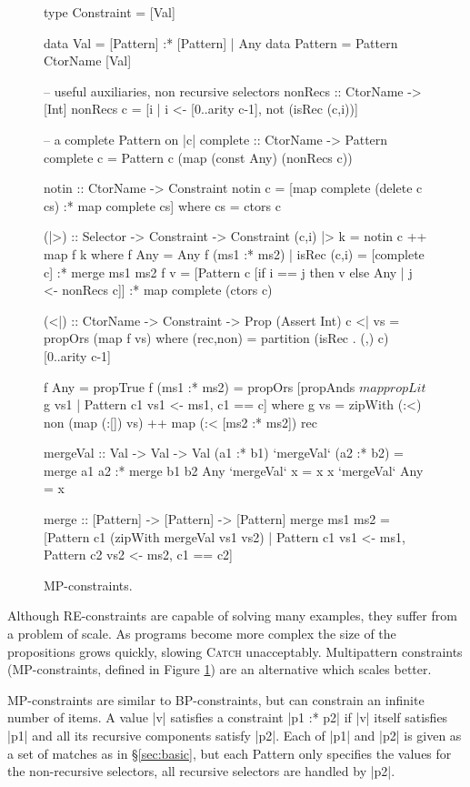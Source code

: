 \documentclass[preprint]{sigplanconf}
\newcommand{\C}[1]{\textsf{#1}}
\newcommand{\catch}{\textsc{Catch}}
\begin{document}
\begin{figure}
\begin{code}
type Constraint = [Val]

data Val      =  [Pattern] :* [Pattern]
              |  Any
data Pattern  =  Pattern CtorName [Val]

-- useful auxiliaries, non recursive selectors
nonRecs :: CtorName -> [Int]
nonRecs c = [i | i <- [0..arity c-1], not (isRec (c,i))]

-- a complete Pattern on |c|
complete :: CtorName -> Pattern
complete c = Pattern c (map (const Any) (nonRecs c))

notin :: CtorName -> Constraint
notin c = [map complete (delete c cs) :* map complete cs]
    where cs = ctors c

(|>) :: Selector -> Constraint -> Constraint
(c,i) |> k = notin c ++ map f k
    where
    f Any = Any
    f (ms1 :* ms2) | isRec (c,i) = [complete c] :* merge ms1 ms2
    f v =  [Pattern c [if i == j then v else Any | j <- nonRecs c]]
           :* map complete (ctors c)

(<|) :: CtorName -> Constraint -> Prop (Assert Int)
c <| vs = propOrs (map f vs)
    where
    (rec,non) = partition (isRec . (,) c) [0..arity c-1]

    f Any = propTrue
    f (ms1 :* ms2) = propOrs [propAnds $ map propLit $ g vs1 | Pattern c1 vs1 <- ms1, c1 == c]
        where g vs =  zipWith (:<) non (map (:[]) vs) ++
                      map (:< [ms2 :* ms2]) rec

mergeVal :: Val -> Val -> Val
(a1 :* b1) `mergeVal` (a2 :* b2)  = merge a1 a2 :* merge b1 b2
Any        `mergeVal` x           = x
x          `mergeVal` Any         = x

merge :: [Pattern] -> [Pattern] -> [Pattern]
merge  ms1 ms2 = [Pattern c1 (zipWith mergeVal vs1 vs2) |
       Pattern c1 vs1 <- ms1, Pattern c2 vs2 <- ms2, c1 == c2]
\end{code}
\caption{MP-constraints.}
\label{fig:enumeration}
\end{figure}

Although RE-constraints are capable of solving many examples, they suffer from a problem of scale. As programs become more complex the size of the propositions grows quickly, slowing \catch{} unacceptably. Multipattern constraints (MP-constraints, defined in Figure \ref{fig:enumeration}) are an alternative which scales better.

MP-constraints are similar to BP-constraints, but can constrain an infinite number of items. A value |v| satisfies a constraint |p1 :* p2| if |v| itself satisfies |p1| and all its recursive components satisfy |p2|. Each of |p1| and |p2| is given as a set of matches as in \S\ref{sec:basic}, but each \C{Pattern} only specifies the values for the non-recursive selectors, all recursive selectors are handled by |p2|.
\end{document}
